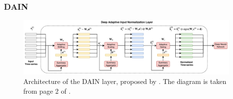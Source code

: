 \documentclass{statsmsc}
\begin{document}
{%
\subsubsection{DAIN}%
\label{ssub:DAIN}



\begin{figure}
    \begin{center}
        \includegraphics[width=\textwidth]{diagrams/dain_diagram.pdf}
    \end{center}
    \caption{Architecture of the \acf{DAIN} layer, proposed by \citeauthor{dain}. The diagram
    is taken from page 2 of \cite{dain}.}
    \label{fig:dain-arch}
\end{figure}

}
\end{document}
